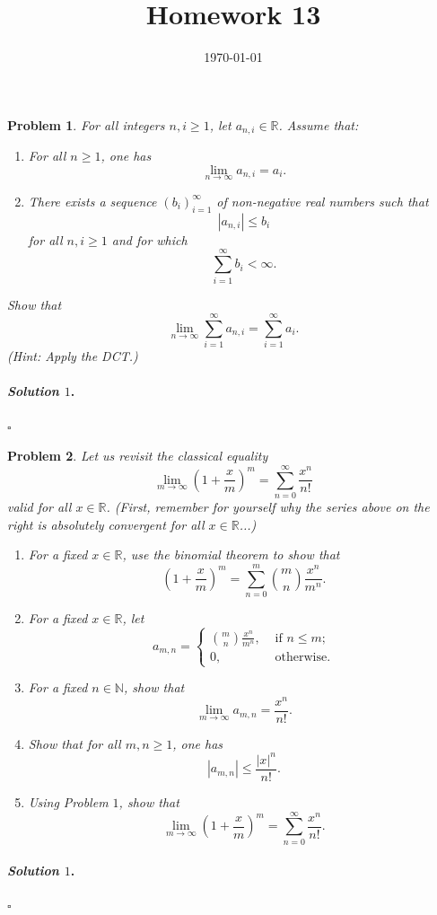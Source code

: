 \documentclass[reqno]{amsart}
\theoremstyle{plain}
\newtheorem{problem}{Problem}
\theoremstyle{definition}
\newenvironment{solution1}{\paragraph{\emph{Solution $1$}.}}{\hfill$\square$}
\begin{document}
 

\title[Homework 13]{Homework 13}

\date{\today} 
\maketitle 




\begin{problem}
For all integers $n,i \ge 1$, let $a_{n,i} \in \mathbb{R}$.  Assume that:
\begin{enumerate}
\item For all $n \ge 1$, one has
$$\lim_{n \to \infty} a_{n,i} = a_{i}. $$
\item There exists a sequence $(b_{i})_{i=1}^{\infty}$ of non-negative real numbers such that 
$$|a_{n,i}| \le b_{i}$$
for all $n,i \ge 1$ and for which 
$$\sum_{i=1}^{\infty}b_{i} < \infty. $$
\end{enumerate}
Show that
$$\lim_{n \to \infty}\sum_{i=1}^{\infty}a_{n,i} = \sum_{i=1}^{\infty}a_{i}. $$
(Hint:  Apply the DCT.)
\end{problem}
\begin{solution1}

\end{solution1}

\begin{problem}
Let us revisit the classical equality
$$\lim_{m \to \infty}\left(1 + \frac{x}{m} \right)^{m} = \sum_{n=0}^{\infty}\frac{x^{n}}{n!} $$
valid for all $x \in \mathbb{R}$.  (First, remember for yourself why the series above on the right is absolutely convergent for all $x \in \mathbb{R}$...)
\begin{enumerate}
\item For a fixed $x \in \mathbb{R}$, use the binomial theorem to show that
$$\left(1 + \frac{x}{m} \right)^{m} = \sum_{n=0}^{m} \binom{m}{n} \frac{x^{n}}{m^{n}}. $$
\item For a fixed $x \in \mathbb{R}$, let
$$a_{m,n} = \begin{cases} \binom{m}{n}\frac{x^{n}}{m^{n}}, &\text{ if } n \le m;\\
0, &\text{ otherwise.}
 \end{cases} $$
\item For a fixed $n \in \mathbb{N}$, show that
$$\lim_{m \to \infty} a_{m,n} = \frac{x^{n}}{n!}.$$
\item Show that for all $m,n \ge 1$, one has
$$|a_{m,n}| \le \frac{|x|^{n}}{n!}. $$
\item Using Problem $1$, show that
$$\lim_{m \to \infty}\left(1 + \frac{x}{m} \right)^{m} = \sum_{n=0}^{\infty}\frac{x^{n}}{n!}. $$
\end{enumerate}
\end{problem}
\begin{solution1}

\end{solution1}
\end{document}
